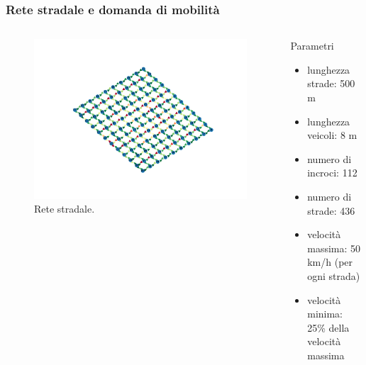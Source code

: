 \documentclass[
	11pt, %
]{beamer}
\begin{document}
\begin{frame}
	\frametitle{Rete stradale e domanda di mobilit\`a} %
	\begin{columns}[c]
	\begin{column}{.5\textwidth}
		\centering
		\begin{figure}
			\includegraphics[width=\textwidth]{free_flow.png}
			\caption{Rete stradale.}
		\end{figure}
	\end{column}
	\begin{column}{.5\textwidth}
		\begin{block}{Parametri}
			\begin{itemize}
				\item lunghezza strade: 500 m
				\item lunghezza veicoli: 8 m
				\item numero di incroci: 112
				\item numero di strade: 436
				\item velocit\`a massima: 50 km/h (per ogni strada)
				\item velocit\`a minima: 25\% della velocit\`a massima
			\end{itemize}
			
		\end{block}
		
	\end{column}
		
	\end{columns}
	
	
\end{frame}
\end{document}
